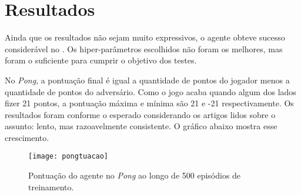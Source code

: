 
\chapter{Resultados}
\label{cap:resultados}

Ainda que os resultados não sejam muito expressivos, o agente obteve sucesso considerável no .
Os hiper-parâmetros escolhidos não foram os melhores, mas foram o suficiente para cumprir o objetivo dos testes.

No \textit{Pong}, a pontuação final é igual a quantidade de pontos do jogador menos a quantidade de pontos do adversário. Como o jogo acaba quando algum dos lados fizer 21 pontos, a pontuação máxima e mínima são 21 e -21 respectivamente.
Os resultados foram conforme o esperado considerando os artigos lidos sobre o assunto: lento, mas razoavelmente consistente.
O gráfico abaixo mostra esse crescimento.

\begin{figure}[h!]
  \texttt{[image: pongtuacao]}
  \centering
  \caption{Pontuação do agente no \textit{Pong} ao longo de 500 episódios de treinamento.}
\end{figure}




